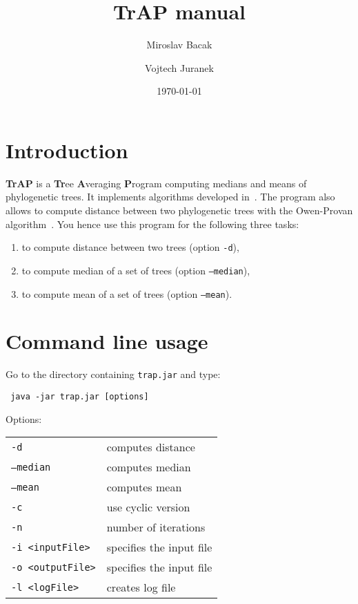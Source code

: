 \documentclass[a4paper,12pt]{amsart}
\title{TrAP manual}
\author{Miroslav Bacak \and Vojtech Juranek}
\date{\today}
\begin{document}
\maketitle


\section{Introduction}

\textbf{TrAP} is a \textbf{Tr}ee \textbf{A}veraging \textbf{P}rogram computing medians and means of phylogenetic trees. It implements algorithms developed in~\cite{mm}. The program also allows to compute distance between two phylogenetic trees with the Owen-Provan algorithm~\cite{owenprovan}. You hence use this program for the following three tasks:
\begin{enumerate}
 \item to compute distance between two trees (option \texttt{-d}),
 \item to compute median of a set of trees (option \texttt{--median}),
 \item to compute mean of a set of trees (option \texttt{--mean}).
\end{enumerate}


\section{Command line usage}
Go to the directory containing \texttt{trap.jar} and type:
\begin{verbatim}
 java -jar trap.jar [options]
\end{verbatim}

\vspace{12pt}
Options:

\begin{tabular}{ll}
\\
\texttt{-d} & computes distance \\ 
\texttt{--median} & computes median \\ 
\texttt{--mean} & computes mean \\ 
\texttt{-c} & use cyclic version \\ 
\texttt{-n} & number of iterations \\ 
\texttt{-i <inputFile>} & specifies the input file \\ 
\texttt{-o <outputFile>} & specifies the input file \\ 
\texttt{-l <logFile>} & creates log file \\ 
\end{tabular}
\end{document}
